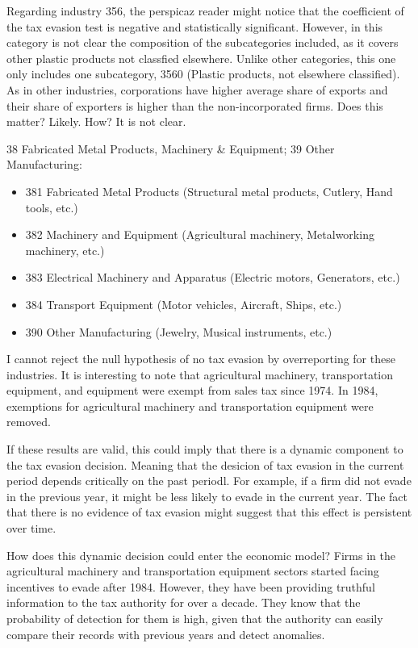 \documentclass[
  12pt]{article}
\providecommand{\tightlist}{%
  \setlength{\itemsep}{0pt}\setlength{\parskip}{0pt}}\usepackage{longtable,booktabs,array}
\theoremstyle{definition}
\theoremstyle{remark}
\begin{document}
Regarding industry 356, the perspicaz reader might notice that the
coefficient of the tax evasion test is negative and statistically
significant. However, in this category is not clear the composition of
the subcategories included, as it covers other plastic products not
classfied elsewhere. Unlike other categories, this one only includes one
subcategory, 3560 (Plastic products, not elsewhere classified). As in
other industries, corporations have higher average share of exports and
their share of exporters is higher than the non-incorporated firms. Does
this matter? Likely. How? It is not clear.

38 Fabricated Metal Products, Machinery \& Equipment; 39 Other
Manufacturing:

\begin{itemize}
\tightlist
\item
  381 Fabricated Metal Products (Structural metal products, Cutlery,
  Hand tools, etc.)
\item
  382 Machinery and Equipment (Agricultural machinery, Metalworking
  machinery, etc.)
\item
  383 Electrical Machinery and Apparatus (Electric motors, Generators,
  etc.)
\item
  384 Transport Equipment (Motor vehicles, Aircraft, Ships, etc.)
\item
  390 Other Manufacturing (Jewelry, Musical instruments, etc.)
\end{itemize}

I cannot reject the null hypothesis of no tax evasion by overreporting
for these industries. It is interesting to note that agricultural
machinery, transportation equipment, and equipment were exempt from
sales tax since 1974. In 1984, exemptions for agricultural machinery and
transportation equipment were removed.

If these results are valid, this could imply that there is a dynamic
component to the tax evasion decision. Meaning that the desicion of tax
evasion in the current period depends critically on the past periodl.
For example, if a firm did not evade in the previous year, it might be
less likely to evade in the current year. The fact that there is no
evidence of tax evasion might suggest that this effect is persistent
over time.

How does this dynamic decision could enter the economic model? Firms in
the agricultural machinery and transportation equipment sectors started
facing incentives to evade after 1984. However, they have been providing
truthful information to the tax authority for over a decade. They know
that the probability of detection for them is high, given that the
authority can easily compare their records with previous years and
detect anomalies.
\end{document}
